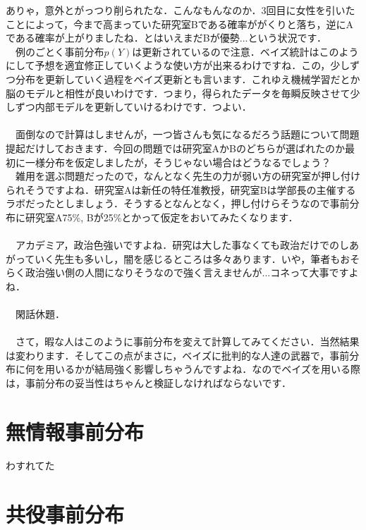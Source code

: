 \documentclass[11pt,a4paper,uplatex]{ujreport} 	%
\begin{document}
ありゃ，意外とがっつり削られたな．こんなもんなのか．3回目に女性を引いたことによって，今まで高まっていた研究室Bである確率ががくりと落ち，逆にAである確率が上がりましたね．とはいえまだBが優勢...という状況です．\\
　例のごとく事前分布$p(Y)$は更新されているので注意．ベイズ統計はこのようにして予想を適宜修正していくような使い方が出来るわけですね．この，少しずつ分布を更新していく過程をベイズ更新とも言います．これゆえ機械学習だとか脳のモデルと相性が良いわけです．つまり，得られたデータを毎瞬反映させて少しずつ内部モデルを更新していけるわけです．つよい．\\
\\
　面倒なので計算はしませんが，一つ皆さんも気になるだろう話題について問題提起だけしておきます．今回の問題では研究室AかBのどちらが選ばれたのか最初に一様分布を仮定しましたが，そうじゃない場合はどうなるでしょう？\\
　雑用を選ぶ問題だったので，なんとなく先生の力が弱い方の研究室が押し付けられそうですよね．研究室Aは新任の特任准教授，研究室Bは学部長の主催するラボだったとしましょう．そうするとなんとなく，押し付けらそうなので事前分布に研究室A75\%, Bが25\%とかって仮定をおいてみたくなります．\\
\\
　アカデミア，政治色強いですよね．研究は大した事なくても政治だけでのしあがっていく先生も多いし，闇を感じるところは多々あります．いや，筆者もおそらく政治強い側の人間になりそうなので強く言えませんが...コネって大事ですよね．\\
\\
　閑話休題．
\\
\\
　さて，暇な人はこのように事前分布を変えて計算してみてください．当然結果は変わります．そしてこの点がまさに，ベイズに批判的な人達の武器で，事前分布に何を用いるかが結局強く影響しちゃうんですよね．なのでベイズを用いる際は，事前分布の妥当性はちゃんと検証しなければならないです．











\section{無情報事前分布}





わすれてた

\section{共役事前分布}
\end{document}
